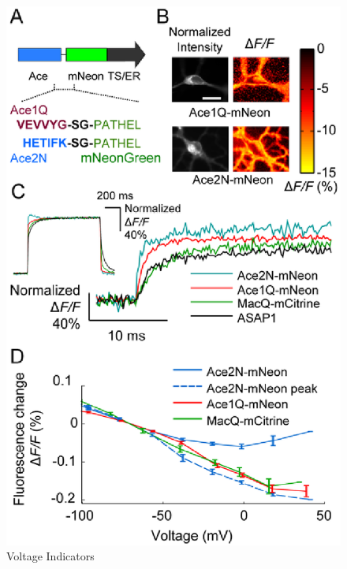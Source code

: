 \documentclass[main]{subfiles}
\begin{document}
\begin{figure}[H]
	\centering
	\includegraphics[width=0.9\linewidth]{09_WhySpikes/figures/Aceq.png}
	\caption{Voltage Indicators}
\end{figure}
\end{document}
